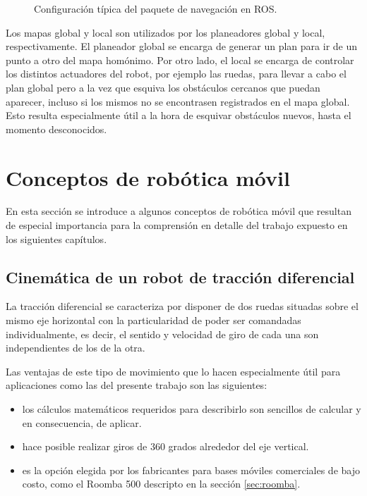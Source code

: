 \begin{figure}[ht]
    \centering
    \def\svgwidth{350pt}
    
    \caption{Configuración típica del paquete de navegación en ROS.}
    \label{fig:navigationStack}
\end{figure}

Los mapas global y local son utilizados por los planeadores global y local, respectivamente. El planeador global se encarga de generar un plan para ir de un punto a otro del mapa homónimo. Por otro lado, el local se encarga de controlar los distintos actuadores del robot, por ejemplo las ruedas, para llevar a cabo el plan global pero a la vez que esquiva los obstáculos cercanos que puedan aparecer, incluso si los mismos no se encontrasen registrados en el mapa global. Esto resulta especialmente útil a la hora de esquivar obstáculos nuevos, hasta el momento desconocidos.

\section{Conceptos de robótica móvil}

En esta sección se introduce a algunos conceptos de robótica móvil que resultan de especial importancia para la comprensión en detalle del trabajo expuesto en los siguientes capítulos.

\subsection{Cinemática de un robot de tracción diferencial}

La tracción diferencial se caracteriza por disponer de dos ruedas situadas sobre el mismo eje horizontal con la particularidad de poder ser comandadas individualmente, es decir, el sentido y velocidad de giro de cada una son independientes de los de la otra.

Las ventajas de este tipo de movimiento que lo hacen especialmente útil para aplicaciones como las del presente trabajo son las siguientes:

\begin{itemize}
    \item los cálculos matemáticos requeridos para describirlo son sencillos de calcular y en consecuencia, de aplicar.
    \item hace posible realizar giros de 360 grados alrededor del eje vertical.
    \item es la opción elegida por los fabricantes para bases móviles comerciales de bajo costo, como el Roomba 500 descripto en la sección \ref{sec:roomba}.
\end{itemize}

